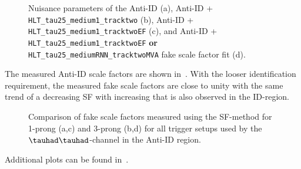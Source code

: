 \begin{figure}[htbp]
  \centering


  \caption{Nuisance parameters of the Anti-ID (a), Anti-ID +
    \texttt{HLT\_tau25\_medium1\_tracktwo} (b), Anti-ID +
    \texttt{HLT\_tau25\_medium1\_tracktwoEF} (c), and Anti-ID +
    \texttt{HLT\_tau25\_medium1\_tracktwoEF} \textbf{or}
    \texttt{HLT\_tau25\_mediumRNN\_tracktwoMVA} fake \tauhad \ttbar
    scale factor fit (d).}
  \label{fig:ttbarfake_hadhad_nps_antitau}
\end{figure}

The measured Anti-ID scale factors are shown
in~. With the looser \tauhad
identification requirement, the measured fake \ttbar scale factors are
close to unity with the same trend of a decreasing SF with increasing
\tauhad \pT that is also observed in the ID-region.

\begin{figure}[htbp]
  \centering



  \caption{Comparison of fake \tauhad scale factors measured using the
    SF-method for 1-prong \tauhad (a,c) and 3-prong \tauhad (b,d) for
    all trigger setups used by the $\tauhad\tauhad$-channel in the
    Anti-ID region.}
  \label{fig:ttbar_hadhad_sf_antitau}
\end{figure}

Additional plots can be found
in~.

